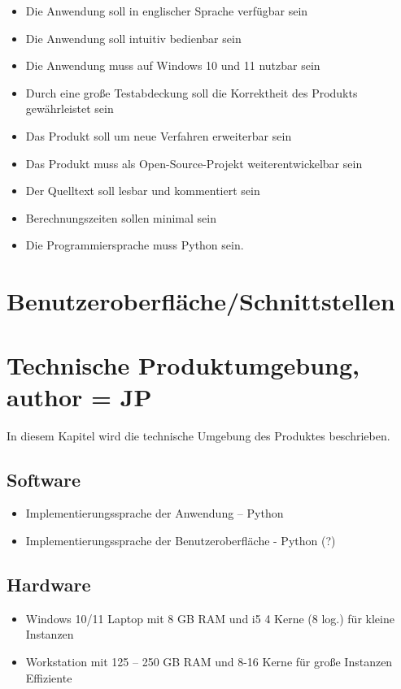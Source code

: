 \documentclass[parskip=full]{scrartcl} %
\begin{document}
\begin{itemize}
    \item Die Anwendung soll in englischer Sprache verfügbar sein
    \item Die Anwendung soll intuitiv bedienbar sein
    \item Die Anwendung muss auf Windows 10 und 11 nutzbar sein
    \item Durch eine große Testabdeckung soll die Korrektheit des Produkts gewährleistet sein
    \item Das Produkt soll um neue Verfahren erweiterbar sein
    \item Das Produkt muss als Open-Source-Projekt weiterentwickelbar sein
    \item Der Quelltext soll lesbar und kommentiert sein
    \item Berechnungszeiten sollen minimal sein
    \item Die Programmiersprache muss Python sein.
\end{itemize}

\newpage



\section{Benutzeroberfläche/Schnittstellen}
\newpage



\section{Technische Produktumgebung, author = JP}
In diesem Kapitel wird die technische Umgebung des Produktes beschrieben.

\subsection{Software}
\begin{itemize}
    \item Implementierungssprache der Anwendung – Python
    \item Implementierungssprache der Benutzeroberfläche - Python (?)
\end{itemize}

\subsection{Hardware}
\begin{itemize}
    \item Windows 10/11 Laptop mit 8 GB RAM und i5 4 Kerne (8 log.) für kleine Instanzen
    \item Workstation mit 125 – 250 GB RAM und 8-16 Kerne für große Instanzen Effiziente
\end{itemize}
\end{document}
